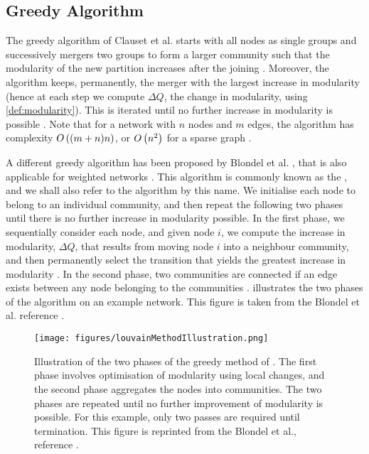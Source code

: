 
\subsection{Greedy Algorithm}
\label{subsec:greedyAlgorithm}

The greedy algorithm of Clauset et al. \cite{CNM04} starts with all nodes as single groups and successively mergers two groups to form a larger community such that the modularity of the new partition increases after the joining \cite{CNM04,For10}.
Moreover, the algorithm keeps, permanently, the merger with the largest increase in modularity (hence at each step we compute $\Delta Q$, the change in modularity, using \cref{def:modularity}).
This is iterated until no further increase in modularity is possible \cite{CNM04}.
Note that for a network with $n$ nodes and $m$ edges, the algorithm has complexity $O\left((m+n)n\right)$, or $O\left(n^{2}\right)$ for a sparse graph \cite{For10}.

A different greedy algorithm has been proposed by Blondel et al. \cite{BGL+08}, that is also applicable for weighted networks \cite{For10}.
This algorithm is commonly known as the , and we shall also refer to the algorithm by this name.
We initialise each node to belong to an individual community, and then repeat the following two phases until there is no further increase in modularity possible.
In the first phase, we sequentially consider each node, and given node $i$, we compute the increase in modularity, $\Delta Q$, that results from moving node $i$ into a neighbour community, and then permanently select the transition that yields the greatest increase in modularity \cite{BGL+08,For10}.
In the second phase, two communities are connected if an edge exists between any node belonging to the communities \cite{BGL+08,For10}.
 illustrates the two phases of the algorithm on an example network. This figure is taken from the Blondel et al. reference \cite{BGL+08}.

\begin{figure}
	\centering
	\texttt{[image: figures/louvainMethodIllustration.png]}
	\caption[Illustration of greedy algorithm for modularity optimisation.]{\label{fig:LouvainMethodIllustration} Illustration of the two phases of the greedy method of \cite{BGL+08}. The first phase involves optimisation of modularity using local changes, and the second phase aggregates the nodes into communities. The two phases are repeated until no further improvement of modularity is possible. For this example, only two passes are required until termination. This figure is reprinted from the Blondel et al., reference \cite{BGL+08}.}
\end{figure}

